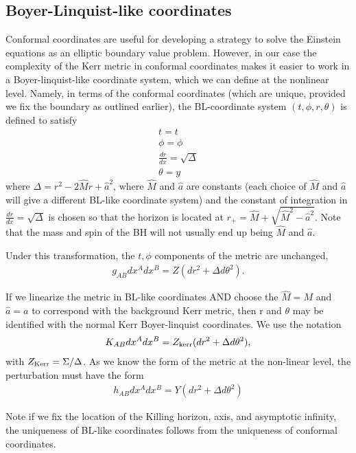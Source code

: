 \documentclass[aps,prd,amsmath,showpacs,amssymb,superscriptaddress,nofootinbib,longbibliography,eqsecnum,preprintnumbers]{revtex4-1}
\begin{document}
\subsection{Boyer-Linquist-like coordinates}

Conformal coordinates are useful for developing a strategy to solve the Einstein equations as an elliptic boundary value problem. However, in our case the complexity of the Kerr metric in conformal coordinates makes it easier to work in a Boyer-linquist-like coordinate system, which we can define at the nonlinear level. Namely, in terms of the conformal coordinates (which are unique, provided we fix the boundary as outlined earlier), the BL-coordinate system $(t,\phi, r,\theta)$ is defined to satisfy
\begin{align}
t=t \nonumber \\
\phi =\phi \nonumber \\
\frac{dr}{dx}=\sqrt{\Delta} \nonumber \\
\theta =y
\end{align}
where $\Delta = r^2-2\hat M r+\hat a^2$, where $\hat M$ and $\hat a$ are constants (each choice of $\hat M$ and $\hat a$ will give a different BL-like coordinate system) and the constant of integration in $\frac{dr}{dx}=\sqrt{\Delta}$ is chosen so that the horizon is located at $r_+=\hat M+\sqrt{\hat M^2-\hat a^2}$. Note that the mass and spin of the BH will not usually end up being $\hat M$ and $\hat a$. 

Under this transformation, the $t, \phi$ components of the metric are unchanged,
\begin{align}
g_{AB}dx^Adx^B=Z(dr^2+\Delta d\theta^2).
\end{align}

If we linearize the metric in BL-like coordinates AND choose the $\hat M =M$ and $\hat a =a$ to correspond with the background Kerr metric, then r and $\theta$ may be identified with the normal Kerr Boyer-linquist coordinates. We use the notation 
\begin{align}
K_{AB}dx^Adx^B=Z_{\rm kerr}(dr^2+\Delta d\theta^2),
\end{align}
with $Z_{\rm Kerr} = \Sigma/\Delta$.
As we know the form of the metric at the non-linear level, the perturbation must have the form
\begin{align}
h_{AB}dx^Ad x^B =Y(dr^2+ \Delta d\theta^2) \label{eq:BLpert}
\end{align}

Note if we fix the location of the Killing horizon, axis, and asymptotic infinity, the uniqueness of BL-like coordinates follows from the uniqueness of conformal coordinates. 
\end{document}
